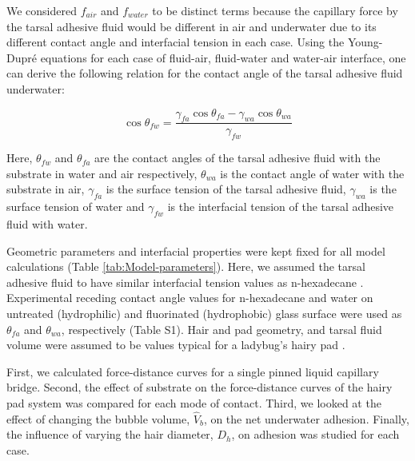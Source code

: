 \documentclass[vruler,JEB]{COB}%
\begin{document}
We considered $f_{air}$ and $f_{water}$ to be distinct terms
because the capillary force by the tarsal adhesive fluid would be different
in air and underwater due to its different contact angle and interfacial
tension in each case. Using the Young-Dupr\'{e} equations
for each case of fluid-air, fluid-water and water-air interface, one
can derive the following relation for the contact angle of the tarsal adhesive
fluid underwater:

\begin{equation}
\cos\theta_{fw}=\frac{\gamma_{fa}\cos\theta_{fa}-\gamma_{wa}\cos\theta_{wa}}{\gamma_{fw}}\label{eq:theta_fw}
\end{equation}

Here, $\theta_{fw}$ and $\theta_{fa}$ are the contact angles of
the tarsal adhesive fluid with the substrate in water and air respectively,
$\theta_{wa}$ is the contact angle of water with the substrate in
air, $\gamma_{fa}$ is the surface tension of the tarsal adhesive fluid,
$\gamma_{wa}$ is the surface tension of water and $\gamma_{fw}$
is the interfacial tension of the tarsal adhesive fluid with water.
%

Geometric parameters and interfacial properties were kept fixed for
all model calculations (Table \ref{tab:Model-parameters}). Here,
we assumed the tarsal adhesive fluid to have similar interfacial tension values as n-hexadecane \citep{RN320}. Experimental receding contact angle values for n-hexadecane and water
on untreated (hydrophilic) and fluorinated (hydrophobic) glass surface were used as 
 $\theta_{fa}$ and $\theta_{wa}$, respectively (Table S1).
Hair and pad geometry, and tarsal fluid volume were assumed to be values typical
for a ladybug's hairy pad \citep{RN19, RN108}.

First, we calculated force-distance curves for a single pinned liquid
capillary bridge. Second, the effect of substrate on the force-distance
curves of the hairy pad system was compared for each mode of contact.
Third, we looked at the effect of changing the bubble
volume, $\hat{V}_{b}$, on the net underwater adhesion.
Finally, the influence of varying the hair diameter, $D_{h}$, on adhesion
was studied for each case.
\end{document}
